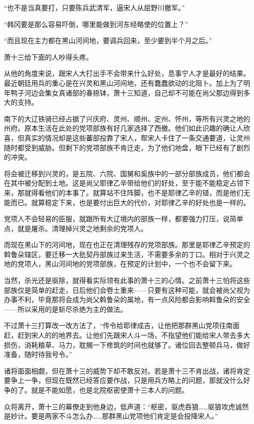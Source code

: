 “也不是当真要打，只要陈兵武清军，逼宋人从屈野川撤军。”

“韩冈要是那么容易吓倒，哪里能做到河东经略使的位置上？”

“而且现在主力都在黑山河间地，要调兵回来，至少要到半个月之后。”

萧十三给下面的人吵得头疼。

从他的角度来说，跟宋人大打出手不会带来什么好处，息事宁人才是最好的结果。最近朝廷用兵的重心是在兴灵和黑山河间地，还有蠢蠢欲动的北阻卜。加上为了明年鸭子河边会集女真诸部的春捺钵，萧十三知道，自己却不可能在尚父那边得到多大的支持。

南下的大辽铁骑已经占据了兴庆府、灵州、顺州、定州、怀州，等所有兴灵之地的州府。原本生活在此处的党项部族有好几家选择了西撤。他们如此识趣的确让人欣喜，但真实的情况却是这些蕃部投靠了宋人，帮宋人卡住了一条交通要道，让灵州随时都受到威胁。但剩下的党项部族不肯迁走，为了他们地盘，眼下已经有了剧烈的冲突。

将会被迁移到兴灵的，是五院、六院、国舅和奚族中的一部分部族成员，他们都会在其中被分配到土地。这是尚父耶律乙辛带给他们的好处，至于能不能稳定占领下来，那就得看他们的本事了。就算站不住阵脚，也不是耶律乙辛的错，而是他们无能而已。就算稳定下来，也是要付出巨大的代价，对耶律乙辛的好处也是一样的。

党项人不会轻易的臣服，就跟所有大辽境内的部族一样，都要强力打压，说简单点，就是屠杀。清理掉兴灵之地剩余的党项人。

而现在黑山下的河间地，现在也正在清理残存的党项部族。那里是耶律乙辛预定的斡鲁朵辖区，要迁移一大批契丹部族过来生活，不需要多余的丁口。相对于兴灵之地的党项人，黑山河间地的党项部族，在预定的计划中，一个也不会留下来。

当然，杀光还是驱除，就得看实际领有此事的萧十三的心情。之前萧十三怕将这些部族仅是简单的赶走，日后他们会卷土重来——只要有这种可能，就会被尚父视为办事不利，毕竟那将会成为尚父斡鲁朵的属地，有一点风险都会影响斡鲁朵的安全——所以采用的是斩尽杀绝为主的做法。

不过萧十三打算改一改方法了，“传令给耶律成吉，让他把那群黑山党项往南面赶，赶到宋人的的地界去。让他们先跟宋人斗一场，不指望他们能给宋人带去多大损伤，消耗粮草、马力，耽搁一下修筑的时间也就够了。诸位回去整顿兵马，做好准备，随时待我号令。”

诸将面面相觑，但在萧十三的威势下却不敢反对。若是萧十三不肯出战，诸将肯定要争上一争，但现在既然已经答应要作战，只是用兵方略上的问题，那就没什么好争的了。就是不能如愿，也是北院枢密使萧十三本人的问题。

众将离开，萧十三的幕僚走到他身边，低声道：“枢密，驱虎吞狼……驱狼攻虎诚然是妙计。要是两家不斗怎么办……那群黑山党项他们肯定是会投降宋人。”

